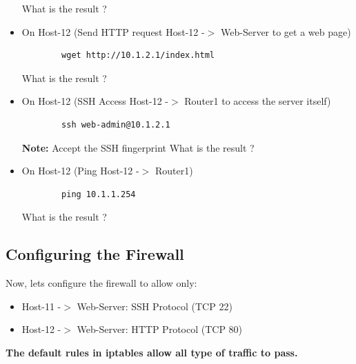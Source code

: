 \begin{itemize}
	What is the result ?
	\item On Host-12 (Send HTTP request Host-12 -$>$ Web-Server to get a web page)
	\begin{verbatim}
	    wget http://10.1.2.1/index.html
	\end{verbatim}

	What is the result ?
	\item On Host-12 (SSH Access Host-12 -$>$ Router1 to access the server itself)
	\begin{verbatim}
	    ssh web-admin@10.1.2.1
	\end{verbatim}

	\textbf{Note:} Accept the SSH fingerprint
	\newline
	\newline
	What is the result ?
	\item On Host-12 (Ping Host-12 -$>$ Router1)
	\begin{verbatim}
	    ping 10.1.1.254
	\end{verbatim}

	What is the result ?
\end{itemize}

\subsection{Configuring the Firewall}

Now, lets configure the firewall to allow only:
\begin{itemize}
	\item Host-11 -$>$ Web-Server: SSH Protocol (TCP 22)
	\item Host-12 -$>$ Web-Server: HTTP Protocol (TCP 80)
\end{itemize}

\textbf{The default rules in iptables allow all type of traffic to pass.}

